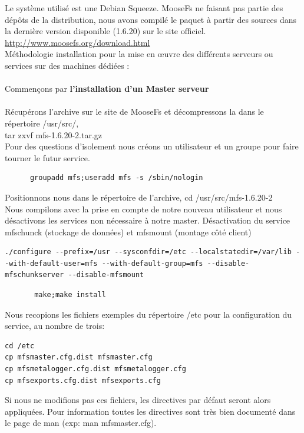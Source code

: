 \documentclass[12pt]{report}
\begin{document}
Le système utilisé est une Debian Squeeze. MooseFs ne faisant pas partie des dépôts de la distribution, nous avons compilé le paquet à partir des sources dans la dernière version disponible (1.6.20) sur le site officiel.\\
\href{http://pro.hit.gemius.pl/hitredir/id=0sWa0S8ft4sTAHF1bGAAEZPcP3ziyq7f9SdhoQf7oeT.c7/url=moosefs.org/tl\_files/mfscode/mfs-1.6.20-2.tar.gz}{http://www.moosefs.org/download.html} \\
Méthodologie installation pour la mise en œuvre des différents serveurs ou services sur des machines dédiées :\\\\
Commençons par \textbf{l'installation d'un Master serveur}\\\\
Récupérons l'archive sur le site de MooseFs et décompressons la dans le répertoire /usr/src/,\\ tar zxvf mfs-1.6.20-2.tar.gz\\
Pour des questions d'isolement nous créons un utilisateur et un groupe pour faire tourner le futur service.\\
\begin{lstlisting}
	  groupadd mfs;useradd mfs -s /sbin/nologin
	  \end{lstlisting}
Positionnons nous dans le répertoire de l'archive, cd /usr/src/mfs-1.6.20-2\\
Nous compilons avec la prise en compte de notre nouveau utilisateur et nous désactivons les services non nécessaire à notre master.
Désactivation du service mfschunck (stockage de données) et mfsmount (montage côté client)
\begin{lstlisting}
./configure --prefix=/usr --sysconfdir=/etc --localstatedir=/var/lib --with-default-user=mfs --with-default-group=mfs --disable-mfschunkserver --disable-mfsmount
	  \end{lstlisting}
\begin{lstlisting}
	   make;make install
	  \end{lstlisting}
Nous recopions les fichiers exemples du répertoire /etc pour la configuration du service, au nombre de trois:
\begin{lstlisting}
cd /etc
cp mfsmaster.cfg.dist mfsmaster.cfg
cp mfsmetalogger.cfg.dist mfsmetalogger.cfg
cp mfsexports.cfg.dist mfsexports.cfg
	  \end{lstlisting}
Si nous ne modifions pas ces fichiers, les directives par défaut seront alors appliquées.
Pour information toutes les directives sont très bien documenté dans le page de man (exp: man mfsmaster.cfg).\\
\end{document}
